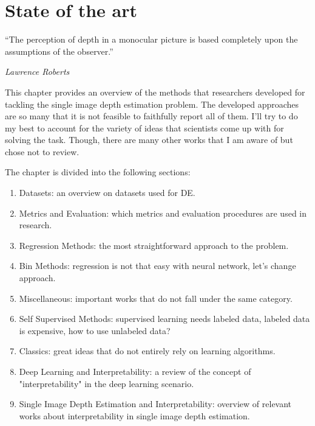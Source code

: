 \chapter{State of the art}
\label{c:sota}

\epigraph{\enquote{The perception of depth in a monocular picture is based completely upon the assumptions of the observer.}}{\emph{Lawrence Roberts}}

This chapter provides an overview of the methods that researchers developed for tackling the single image depth estimation problem.
The developed approaches are so many that it is not feasible to faithfully report all of them.
I'll try to do my best to account for the variety of ideas that scientists come up with for solving the task.
Though, there are many other works that I am aware of but chose not to review.

The chapter is divided into the following sections:
\begin{enumerate}
    \item{Datasets: an overview on datasets used for DE.}
    \item{Metrics and Evaluation: which metrics and evaluation procedures are used in research.}
    \item{Regression Methods: the most straightforward approach to the problem.}
    \item{Bin Methods: regression is not that easy with neural network, let's change approach.}
    \item{Miscellaneous: important works that do not fall under the same category.}
    \item{Self Supervised Methods: supervised learning needs labeled data, labeled data is expensive, how to use unlabeled data?}
    \item{Classics: great ideas that do not entirely rely on learning algorithms.}
    \item{Deep Learning and Interpretability: a review of the concept of "interpretability" in the deep learning scenario.}
    \item{Single Image Depth Estimation and Interpretability: overview of relevant works about interpretability in single image depth estimation.}
\end{enumerate}









